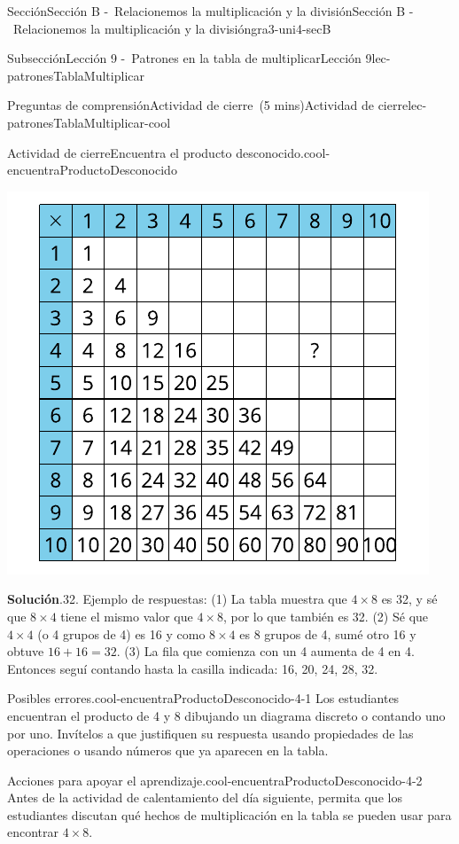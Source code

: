 \documentclass[oneside,10pt,]{article}
\newcommand{\blocktitlefont}{\relax}
\begin{document}
\begin{sectionptx}{Sección}{Sección B -~Relacionemos la multiplicación y la división}{}{Sección B -~Relacionemos la multiplicación y la división}{}{}{gra3-uni4-secB}
\begin{subsectionptx}{Subsección}{Lección 9 -~Patrones en la tabla de multiplicar}{}{Lección 9}{}{}{lec-patronesTablaMultiplicar}
\begin{reading-questions-subsubsection}{Preguntas de comprensión}{Actividad de cierre~(5 mins)}{}{Actividad de cierre}{}{}{lec-patronesTablaMultiplicar-cool}
\begin{project}{Actividad de cierre}{Encuentra el producto desconocido.}{cool-encuentraProductoDesconocido}
\begin{image}{0}{1}{0}{}
\includegraphics[width=\linewidth]{external/svg-source/tikz-file-153040-scale13.pdf}
\end{image}%
\par\smallskip%
\noindent\textbf{\blocktitlefont Solución}.\hypertarget{cool-encuentraProductoDesconocido-3}{}\quad{}32. Ejemplo de respuestas: (1) La tabla muestra que \(4 \times 8\) es 32, y sé que \(8 \times 4\) tiene el mismo valor que \(4 \times 8\), por lo que también es 32. (2) Sé que \(4 \times 4\) (o 4 grupos de 4) es 16 y como \(8 \times 4\) es 8 grupos de 4, sumé otro 16 y obtuve \(16 + 16 = 32\). (3) La fila que comienza con un 4 aumenta de 4 en 4. Entonces seguí contando hasta la casilla indicada: 16, 20, 24, 28, 32.%
\end{project}%
\par
\begin{paragraphs}{Posibles errores.}{cool-encuentraProductoDesconocido-4-1}%
Los estudiantes encuentran el producto de 4 y 8 dibujando un diagrama discreto o contando uno por uno. Invítelos a que justifiquen su respuesta usando propiedades de las operaciones o usando números que ya aparecen en la tabla.%
\end{paragraphs}%
\begin{paragraphs}{Acciones para apoyar el aprendizaje.}{cool-encuentraProductoDesconocido-4-2}%
Antes de la actividad de calentamiento del día siguiente, permita que los estudiantes discutan qué hechos de multiplicación en la tabla se pueden usar para encontrar \(4\times 8\).%

\end{paragraphs}
\end{reading-questions-subsubsection}
\end{subsectionptx}
\end{sectionptx}
\end{document}
